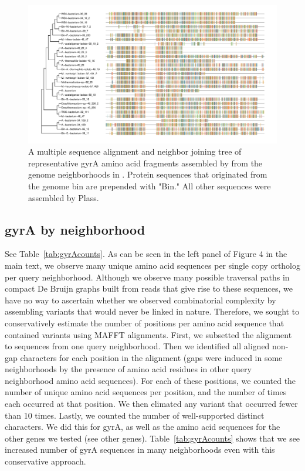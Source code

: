 \begin{figure}
 \centering
 \includegraphics[width=\linewidth]{figures/gyrA-cdhit95-msa}
	\caption{A multiple sequence alignment and neighbor joining tree of representative gyrA amino acid fragments assembled by \plass from the genome neighborhoods in \hu. Protein sequences that originated from the genome bin are prepended with "Bin." All other sequences were assembled by Plass.
 }
 \label{fig:gyrAalign}
\end{figure}

\subsection{gyrA by neighborhood}
\label{subsec:gyrAnbhd}

See Table~\ref{tab:gyrAcounts}. As can be seen in the left panel of Figure 4 in the
main text, we observe many unique amino acid sequences per single copy ortholog
per query neighborhood.
Although we observe many possible traversal paths in compact De Bruijn graphs built
from reads that give rise to these sequences, we have no way to ascertain whether we
observed combinatorial complexity by assembling variants that would never be linked
in nature. Therefore, we sought to conservatively estimate the number of positions
per amino acid sequence that contained variants using MAFFT alignments. First, we
subsetted the alignment to sequences from one query neighborhood. Then we identified
all aligned non-gap characters for each position in the alignment (gaps were induced
in some neighborhoods by the presence of amino acid residues in other query neighborhood
amino acid sequences). For each of these positions, we counted the number of unique
amino acid sequences per position, and the number of times each occurred at that position.
We then elimated any variant that occurred fewer than 10 times. Lastly, we counted the
number of well-supported distinct characters. We did this for gyrA, as well as the
amino acid sequences for the other genes we tested (see other genes). Table~\ref{tab:gyrAcounts}
shows that we see increased number of gyrA sequences in many neighborhoods even with
this conservative approach.

